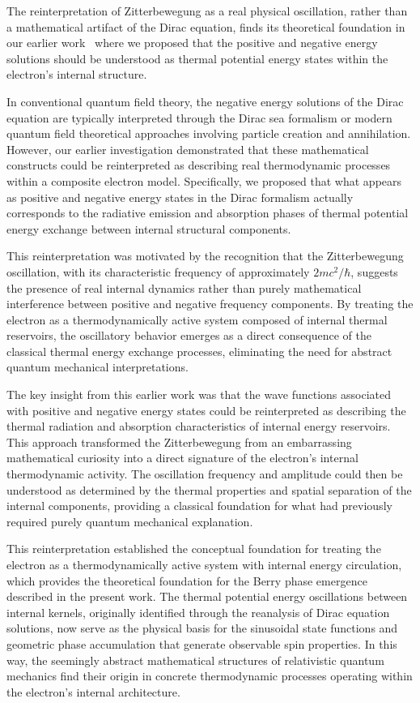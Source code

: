 \documentclass[%
 reprint,
 amsmath,amssymb,
 aps,
]{revtex4-1}
\numberwithin{equation}{section}%
\begin{document}
The reinterpretation of Zitterbewegung as a real physical oscillation, rather than a mathematical artifact of the Dirac equation, finds its theoretical foundation in our earlier work~\cite{hanamura2006.0104} where we proposed that the positive and negative energy solutions should be understood as thermal potential energy states within the electron's internal structure.

In conventional quantum field theory, the negative energy solutions of the Dirac equation are typically interpreted through the Dirac sea formalism or modern quantum field theoretical approaches involving particle creation and annihilation. However, our earlier investigation demonstrated that these mathematical constructs could be reinterpreted as describing real thermodynamic processes within a composite electron model. Specifically, we proposed that what appears as positive and negative energy states in the Dirac formalism actually corresponds to the radiative emission and absorption phases of thermal potential energy exchange between internal structural components.

This reinterpretation was motivated by the recognition that the Zitterbewegung oscillation, with its characteristic frequency of approximately $2mc^2/\hbar$, suggests the presence of real internal dynamics rather than purely mathematical interference between positive and negative frequency components. By treating the electron as a thermodynamically active system composed of internal thermal reservoirs, the oscillatory behavior emerges as a direct consequence of the classical thermal energy exchange processes, eliminating the need for abstract quantum mechanical interpretations.

The key insight from this earlier work was that the wave functions associated with positive and negative energy states could be reinterpreted as describing the thermal radiation and absorption characteristics of internal energy reservoirs. This approach transformed the Zitterbewegung from an embarrassing mathematical curiosity into a direct signature of the electron's internal thermodynamic activity. The oscillation frequency and amplitude could then be understood as determined by the thermal properties and spatial separation of the internal components, providing a classical foundation for what had previously required purely quantum mechanical explanation.

This reinterpretation established the conceptual foundation for treating the electron as a thermodynamically active system with internal energy circulation, which provides the theoretical foundation for the Berry phase emergence described in the present work. The thermal potential energy oscillations between internal kernels, originally identified through the reanalysis of Dirac equation solutions, now serve as the physical basis for the sinusoidal state functions and geometric phase accumulation that generate observable spin properties. In this way, the seemingly abstract mathematical structures of relativistic quantum mechanics find their origin in concrete thermodynamic processes operating within the electron's internal architecture.
\end{document}
